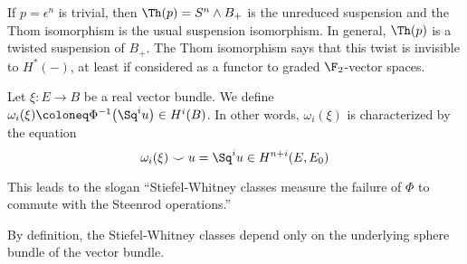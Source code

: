 If $p = \epsilon^n$ is trivial, then $\Th(p) = S^n \wedge B_{+}$ is the unreduced suspension and the Thom isomorphism is the usual suspension isomorphism.
In general, $\Th(p)$ is a twisted suspension of $B_{+}$.
The Thom isomorphism says that this twist is invisible to $H^*({{-}})$, at least if considered as a functor to graded $\F_2$-vector spaces.
\begin{definition}
	Let $\xi\colon E \to B$ be a real vector bundle.
	We define $\omega_i(\xi) \coloneq \Phi^{-1}\big(\Sq^i u\big) \in H^i(B)$.
	In other words, $\omega_i(\xi)$ is characterized by the equation
	\begin{equation*}
		\omega_i(\xi) \smile u = \Sq^i u \in H^{n + i}(E, E_0)
	\end{equation*}
\end{definition}
This leads to the slogan \enquote{Stiefel-Whitney classes measure the failure of $\Phi$ to commute with the Steenrod operations.}
\begin{remark}
	By definition, the Stiefel-Whitney classes depend only on the underlying sphere bundle of the vector bundle.
\end{remark}
